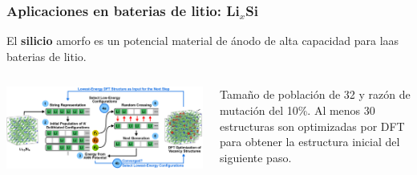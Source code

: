 \documentclass[aspectratio=169]{beamer}
\let\oldtextbf\textbf
\renewcommand{\textbf}[1]{\textcolor{nordblue}{\oldtextbf{#1}}}
\begin{document}
    \begin{frame}
        \frametitle{Aplicaciones en baterias de litio: Li$_x$Si}
        
        El \textbf{silicio} amorfo es un potencial material de ánodo de alta
        capacidad para laas baterias de litio.
        
        \begin{columns}
            \begin{center}
                \includegraphics[width=\columnwidth]{LiSi-metodo.png}
            \end{center}

            Tamaño de población de 32 y razón de mutación del 10\%. Al menos 30 
            estructuras son optimizadas por DFT para obtener la estructura inicial
            del siguiente paso.
        \end{columns}
            
    \end{frame}
    
\end{document}
